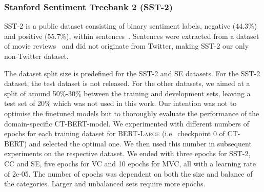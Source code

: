 \documentclass{article}
\begin{document}
\begin{multicols}{2}
\subsubsection{Stanford Sentiment Treebank 2 (SST-2)}
SST-2 is a public dataset consisting of binary sentiment labels, negative (44.3\%) and positive (55.7\%), within sentences~\cite{socher2013recursive}.
Sentences were extracted from a dataset of movie reviews~\cite{pang2005seeing} and did not originate from Twitter, making SST-2 our only non-Twitter dataset.

The dataset split size is predefined for the SST-2 and SE datasets.
For the SST-2 dataset, the test dataset is not released.
For the other datasets, we aimed at a split of around 50\%-30\% between the training and development sets, leaving a test set of 20\% which was not used in this work.
Our intention was not to optimise the finetuned models but to thoroughly evaluate the performance of the domain-specific \textsc{CT-BERT}-model.
We experimented with different numbers of epochs for each training dataset for \textsc{BERT-Large} (i.e.\ checkpoint 0 of \textsc{CT-BERT}) and selected the optimal one.
We then used this number in subsequent experiments on the respective dataset.
We ended with three epochs for SST-2, CC and SE, five epochs for VC and 10 epochs for MVC, all with a learning rate of 2e-05.
The number of epochs was dependent on both the size and balance of the categories.
Larger and unbalanced sets require more epochs.

\end{multicols}
\end{document}
